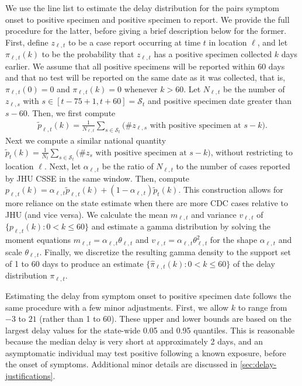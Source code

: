 \documentclass{article}
\begin{document}
We use the line list to estimate the delay distribution for the pairs symptom
onset to positive specimen and positive specimen to report. We provide the full
procedure for the latter, before giving a brief description below for the
former. First, define $z_{\ell,t}$ to be a case report occurring at time $t$ in
location $\ell$, and let $\pi_{\ell,t}(k)$ to be the probability that
$z_{\ell,t}$ has a positive specimen collected $k$ days earlier. We assume that
all positive specimens will be reported within 60 days and that no test will be
reported on the same date as it was collected, that is, $\pi_{\ell,t}(0) = 0$
and $\pi_{\ell,t}(k) = 0$ whenever $k > 60$. Let $N_{\ell,t}$ be the number of
$z_{\ell,s}$ with $s\in[t-75+1,t+60] = \mathcal{S}_t$ and positive specimen date
greater than $s-60$. Then, we first compute
\begin{align*}
    \tilde{p}_{\ell,t}(k) = \frac{1}{N_{\ell,t}}\sum_{s \in \mathcal{S}_t}
    \big(\textrm{\# $z_{\ell,s}$ with positive specimen at $s-k$}\big).
\end{align*}
Next we compute a similar national quantity $\tilde{p}_{t}(k) =
\frac{1}{N_{t}}\sum_{s \in \mathcal{S}_t} \big(\textrm{\# $z_{s}$ with positive
specimen at $s-k$}\big)$, without restricting to location $\ell$. Next, let
$\alpha_{\ell,t}$ be the ratio of $N_{\ell,t}$ to the number of cases reported
by JHU CSSE\cite{dong2020interactive} in the same window. Then, compute
$p_{\ell,t}(k) = \alpha_{\ell,t}\tilde{p}_{\ell,t}(k) +
(1-\alpha_{\ell,t})\tilde{p}_t(k)$. This construction allows for more reliance
on the state estimate when there are more CDC cases relative to JHU (and vice
versa). We calculate the mean $m_{\ell,t}$ and variance $v_{\ell,t}$ of
$\{p_{\ell,t}(k) : 0<k\leq 60\}$ and estimate a gamma distribution by solving
the moment equations $m_{\ell,t} = \alpha_{\ell,t}\theta_{\ell,t}$ and
$v_{\ell,t}= \alpha_{\ell,t}\theta_{\ell,t}^2$ for the shape $\alpha_{\ell,t}$
and scale $\theta_{\ell,t}$. Finally, we discretize the resulting gamma density
to the support set of 1 to 60 days to produce an estimate
$\{\widehat{\pi}_{\ell,t}(k): 0 < k \leq 60\}$ of the delay distribution
$\pi_{\ell,t}$.
 
Estimating the delay from symptom onset to positive specimen date follows the
same procedure with a few minor adjustments. First, we allow $k$ to range from
$-3$ to $21$ (rather than 1 to 60). These upper and lower bounds are based on
the largest delay values for the state-wide 0.05 and 0.95 quantiles. This is
reasonable because the median delay is very short at approximately 2 days, and
an asymptomatic individual may test positive following a known exposure, before
the onset of symptoms. Additional minor details are discussed in
\autoref{sec:delay-justifications}.
\end{document}
